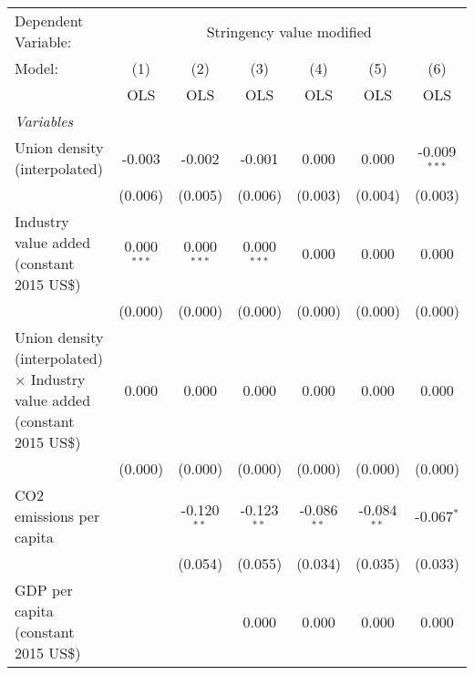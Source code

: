 
\begingroup
\centering
\begin{tabular}{lcccccc}
   \toprule
   Dependent Variable: & \multicolumn{6}{c}{Stringency value modified}\\
   Model:                                                                            & (1)           & (2)           & (3)           & (4)           & (5)           & (6)\\  
                                                                                     &  OLS          & OLS           & OLS           & OLS           & OLS           & OLS\\  
   \midrule
   \emph{Variables}\\
   Union density (interpolated)                                                      & -0.003        & -0.002        & -0.001        & 0.000         & 0.000         & -0.009$^{***}$\\   
                                                                                     & (0.006)       & (0.005)       & (0.006)       & (0.003)       & (0.004)       & (0.003)\\   
   Industry value added (constant 2015 US\$)                                         & 0.000$^{***}$ & 0.000$^{***}$ & 0.000$^{***}$ & 0.000         & 0.000         & 0.000\\   
                                                                                     & (0.000)       & (0.000)       & (0.000)       & (0.000)       & (0.000)       & (0.000)\\   
   Union density (interpolated) $\times$ Industry value added (constant 2015 US\$)   & 0.000         & 0.000         & 0.000         & 0.000         & 0.000         & 0.000\\   
                                                                                     & (0.000)       & (0.000)       & (0.000)       & (0.000)       & (0.000)       & (0.000)\\   
   CO2 emissions per capita                                                          &               & -0.120$^{**}$ & -0.123$^{**}$ & -0.086$^{**}$ & -0.084$^{**}$ & -0.067$^{*}$\\   
                                                                                     &               & (0.054)       & (0.055)       & (0.034)       & (0.035)       & (0.033)\\   
   GDP per capita (constant 2015 US\$)                                               &               &               & 0.000         & 0.000         & 0.000         & 0.000\\   

\end{tabular}
